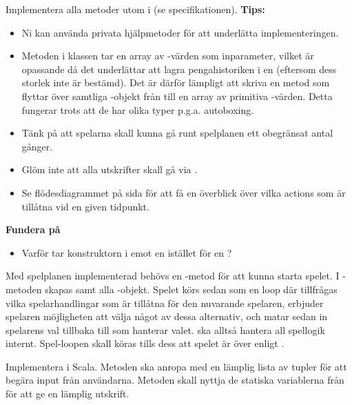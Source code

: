 \Task Implementera alla metoder utom  i  (se specifikationen).
\newline
\newline
\textbf{Tips:}

\begin{itemize}
\item Ni kan använda privata hjälpmetoder för att underlätta implementeringen.
\item Metoden  i klassen  tar en array av -värden som inparameter, vilket är opassande då det underlättar att lagra penga\-historiken i en  (eftersom dess storlek inte är bestämd). Det är därför lämpligt att skriva en metod som flyttar över samtliga -objekt från  till en array av primitiva -värden. Detta fungerar trots att de har olika typer p.g.a. autoboxing.
\item Tänk på att spelarna skall kunna gå runt spelplanen ett obegränsat antal gånger.
\item Glöm inte att alla utskrifter skall gå via  .
\item Se flödesdiagrammet på sida \pageref{fig:scalajava:lthopoly-team:flowchart} för att få en överblick över vilka actions som är tillåtna vid en given tidpunkt.
\end{itemize}

\textbf{Fundera på}
\begin{itemize}
\item Varför tar konstruktorn i  emot en  istället för en ?
\end{itemize}

\Task Med spelplanen implementerad behövs en -metod för att kunna starta spelet. I -metoden skapas  samt alla -objekt. Spelet körs sedan som en loop där  tillfrågas vilka spelarhandlingar som är tillåtna för den nuvarande spelaren, erbjuder spelaren möjligheten att välja något av dessa alternativ, och matar sedan in spelarens val tillbaka till  som hanterar valet.  ska alltså hantera all spellogik internt.  Spel-loopen skall köras tills dess att spelet är över enligt .

\Subtask Implementera  i Scala. Metoden ska anropa  med en lämplig lista av tupler för att begära input från användarna. Metoden  skall nyttja de statiska variablerna från  för att ge en lämplig utskrift.

